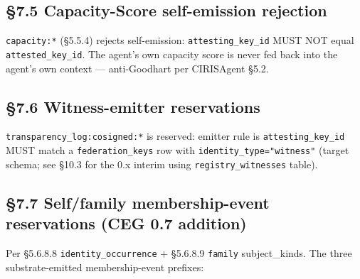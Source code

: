 \documentclass[10pt]{article}
\begin{document}
\subsection*{§7.5 Capacity-Score self-emission rejection}


\texttt{capacity:*} (§5.5.4) rejects self-emission: \texttt{attesting\_key\_id} MUST NOT equal \texttt{attested\_key\_id}. The agent's own capacity score is never fed back into the agent's own context — anti-Goodhart per CIRISAgent §5.2.


\subsection*{§7.6 Witness-emitter reservations}


\texttt{transparency\_log:cosigned:*} is reserved: emitter rule is \texttt{attesting\_key\_id} MUST match a \texttt{federation\_keys} row with \texttt{identity\_type="witness"} (target schema; see §10.3 for the 0.x interim using \texttt{registry\_witnesses} table).


\subsection*{§7.7 Self/family membership-event reservations (CEG 0.7 addition)}


Per §5.6.8.8 \texttt{identity\_occurrence} + §5.6.8.9 \texttt{family} subject\_kinds. The three substrate-emitted membership-event prefixes:
\end{document}
